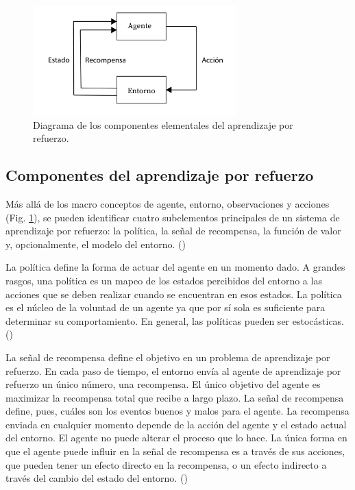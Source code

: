 \begin{figure}[ht!]
    \centering
    \includegraphics[width=0.7\textwidth]{Graphics/rl-elements.png}
    \caption{Diagrama de los componentes elementales del aprendizaje por refuerzo.}
    \label{fig:rl-elements}
\end{figure}

\subsection{Componentes del aprendizaje por refuerzo}

Más allá de los macro conceptos de agente, entorno, observaciones y acciones (Fig. \ref{fig:rl-elements}), se pueden identificar cuatro subelementos principales de un sistema de aprendizaje por refuerzo: la política, la señal de recompensa, la función de valor y, opcionalmente, el modelo del entorno. (\cite{sutton1998introduction})

La política define la forma de actuar del agente en un momento dado. A grandes rasgos, una política es un mapeo de los estados percibidos del entorno a las acciones que se deben realizar cuando se encuentran en esos estados. La política es el núcleo de la voluntad de un agente ya que por sí sola es suficiente para determinar su comportamiento. En general, las políticas pueden ser estocásticas. (\cite{sutton1998introduction})

La señal de recompensa define el objetivo en un problema de aprendizaje por refuerzo. En cada paso de tiempo, el entorno envía al agente de aprendizaje por refuerzo un único número, una recompensa. El único objetivo del agente es maximizar la recompensa total que recibe a largo plazo. La señal de recompensa define, pues, cuáles son los eventos buenos y malos para el agente. La recompensa enviada en cualquier momento depende de la acción del agente y el estado actual del entorno. El agente no puede alterar el proceso que lo hace. La única forma en que el agente puede influir en la señal de recompensa es a través de sus acciones, que pueden tener un efecto directo en la recompensa, o un efecto indirecto a través del cambio del estado del entorno. (\cite{sutton1998introduction})

